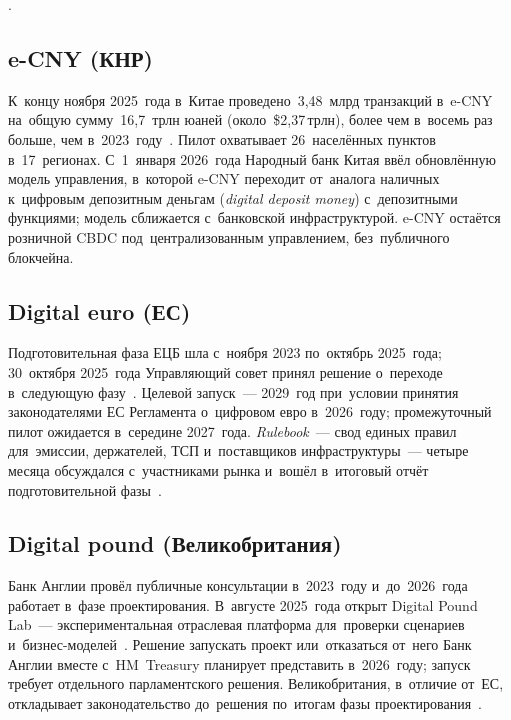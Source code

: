 .

\subsection*{e-{CNY} (КНР)}

К~концу ноября 2025~года в~Китае проведено~3,48~млрд транзакций в~e-CNY на~общую
сумму~16,7~трлн юаней (около~\$2,37\,трлн), более чем в~восемь раз больше, чем
в~2023~году~\cite{gov-cn-ecny-2026}. Пилот охватывает 26~населённых пунктов в~17~регионах. С~1~января
2026~года Народный банк Китая ввёл обновлённую модель управления, в~которой
e-CNY переходит от~аналога наличных к~цифровым депозитным деньгам
(\textit{digital deposit money}) с~депозитными функциями; модель сближается
с~банковской инфраструктурой. e-CNY
остаётся розничной CBDC под~централизованным управлением, без~публичного блокчейна.

\subsection*{Digital euro (ЕС)}

Подготовительная фаза ЕЦБ шла с~ноября 2023 по~октябрь 2025~года; 30~октября
2025~года Управляющий совет принял решение о~переходе в~следующую
фазу~\cite{ecb-digital-euro-next-phase-2025}. Целевой запуск~--- 2029~год
при~условии принятия законодателями ЕС Регламента о~цифровом евро
в~2026~году; промежуточный пилот ожидается в~середине 2027~года. \textit{Rulebook}~---
свод единых правил для~эмиссии, держателей, ТСП и~поставщиков инфраструктуры~---
четыре месяца обсуждался с~участниками рынка и~вошёл в~итоговый отчёт
подготовительной фазы~\cite{ecb-deprp-2025}.

\subsection*{Digital pound (Великобритания)}

Банк Англии провёл публичные консультации в~2023~году и~до~2026~года
работает в~фазе проектирования. В~августе 2025~года открыт Digital Pound Lab~---
экспериментальная отраслевая платформа для~проверки сценариев
и~бизнес-моделей~\cite{boe-digital-pound-design-2025}. Решение запускать проект
или~отказаться от~него Банк Англии вместе с~HM~Treasury планирует представить
в~2026~году; запуск требует отдельного парламентского решения.
Великобритания, в~отличие от~ЕС, откладывает законодательство до~решения
по~итогам фазы проектирования~\cite{boe-digital-pound}.

